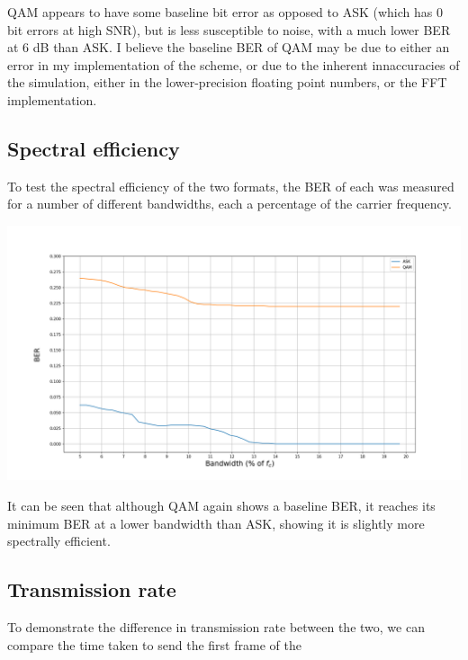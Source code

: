 \documentclass{article}
\begin{document}
QAM appears to have some baseline bit error as opposed to ASK (which has 0 bit errors at high SNR), but is less susceptible to noise, with a much lower BER at 6 dB than ASK. I believe the baseline BER of QAM may be due to either an error in my implementation of the scheme, or due to the inherent innaccuracies of the simulation, either in the lower-precision floating point numbers, or the FFT implementation.

\subsection{Spectral efficiency}
To test the spectral efficiency of the two formats, the BER of each was measured for a number of different bandwidths, each a percentage of the carrier frequency. 

\noindent
\includegraphics[width=\textwidth]{figures/bandwidth.png}

It can be seen that although QAM again shows a baseline BER, it reaches its minimum BER at a lower bandwidth than ASK, showing it is slightly more spectrally efficient. 

\subsection{Transmission rate}
To demonstrate the difference in transmission rate between the two, we can compare the time taken to send the first frame of the 
\end{document}
